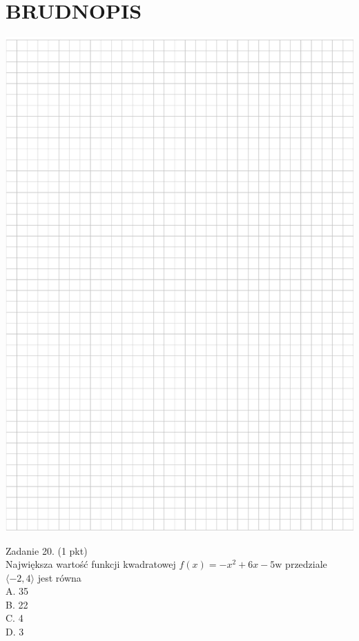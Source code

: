 \documentclass[10pt]{article}
\begin{document}
\section*{BRUDNOPIS}
\begin{center}
\includegraphics[max width=\textwidth]{2024_11_21_8e981e1ab2c7e641f462g-07}
\end{center}

Zadanie 20. (1 pkt)\\
Największa wartość funkcji kwadratowej \(f(x)=-x^{2}+6 x-5 \mathrm{w}\) przedziale \(\langle-2,4\rangle\) jest równa\\
A. 35\\
B. 22\\
C. 4\\
D. 3
\end{document}
